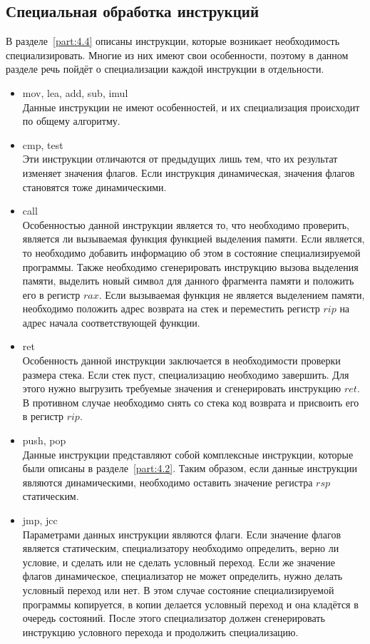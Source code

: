 \subsection{Специальная обработка инструкций}
\label{part:5.4}
В разделе~\ref{part:4.4} описаны инструкции, которые возникает необходимость специализировать. Многие из них имеют свои особенности, поэтому в данном разделе речь пойдёт о специализации каждой инструкции в отдельности.
\begin{itemize}
\item \textsf{mov, lea, add, sub, imul}\\
  Данные инструкции не имеют особенностей, и их специализация происходит по общему алгоритму.
\item \textsf{cmp, test}\\
  Эти инструкции отличаются от предыдущих лишь тем, что их результат изменяет значения флагов. Если инструкция динамическая, значения флагов становятся тоже динамическими.
\item \textsf{call}\\
  Особенностью данной инструкции является то, что необходимо проверить, является ли вызываемая функция функцией выделения памяти.
  Если является, то необходимо добавить информацию об этом в состояние
  специализируемой программы. Также необходимо сгенерировать инструкцию вызова выделения памяти,
  выделить новый символ для данного фрагмента памяти и положить его в регистр $rax$. Если вызываемая
  функция не является выделением памяти, необходимо положить адрес возврата на стек и переместить регистр
  $rip$ на адрес начала соответствующей функции.
\item \textsf{ret}\\
  Особенность данной инструкции заключается в необходимости проверки размера стека. Если стек пуст,
  специализацию необходимо завершить. Для этого нужно выгрузить требуемые значения и сгенерировать
  инструкцию $ret$. В противном случае необходимо снять со стека код возврата и присвоить его в регистр
  $rip$.
\item \textsf{push, pop}\\
  Данные инструкции представляют собой комплексные инструкции, которые были описаны
  в разделе~\ref{part:4.2}.
  Таким образом, если данные инструкции являются динамическими, необходимо оставить значение регистра
  $rsp$ статическим.
\item \textsf{jmp, jcc}\\
  Параметрами данных инструкции являются флаги. Если значение флагов является статическим, специализатору
  необходимо определить, верно ли условие, и сделать или не сделать условный переход.
  Если же значение флагов динамическое, специализатор не может определить, нужно делать условный переход
  или нет.
  В этом случае состояние специализируемой программы копируется, в копии делается условный переход
  и она кладётся в очередь состояний.
  После этого специализатор должен сгенерировать инструкцию условного перехода и продолжить специализацию.
\end{itemize}

